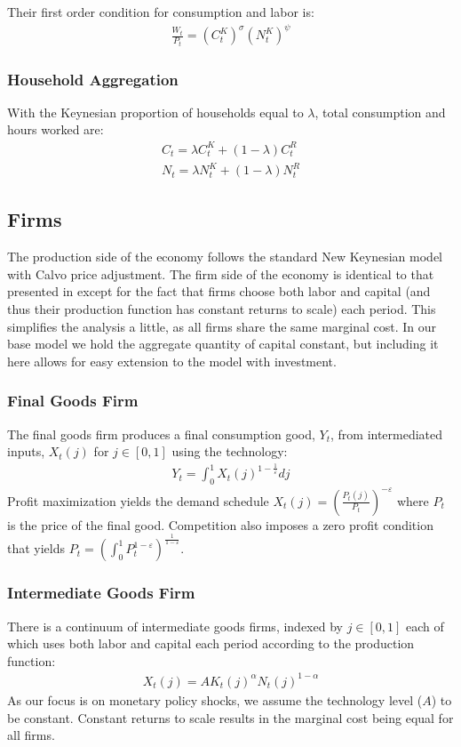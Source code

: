 \documentclass[titlepage]{\econtex}\newcommand{\texname}{ConsumptionHeterogeneity}
\begin{document}
Their first order condition for consumption and labor is:
\begin{align}
\frac{W_t}{P_t} = \left(C^K_t\right)^{\sigma}\left(N^K_t\right)^{\psi} \label{foc_hours_K}
\end{align}

\subsubsection{Household Aggregation}
With the Keynesian proportion of households equal to $\lambda$, total consumption and hours worked are:
\begin{align}
C_t = \lambda C^K_t + (1-\lambda) C^R_t \label{agg_C}\\
N_t = \lambda N^K_t + (1-\lambda) N^R_t \label{agg_N}
\end{align}

\subsection {Firms}
The production side of the economy follows the standard New Keynesian model with Calvo price adjustment. The firm side of the economy is identical to that presented in \cite{gali_book} except for the fact that firms choose both labor and capital (and thus their production function has constant returns to scale) each period. This simplifies the analysis a little, as all firms share the same marginal cost. In our base model we hold the aggregate quantity of capital constant, but including it here allows for easy extension to the model with investment.

\subsubsection{Final Goods Firm}
The final goods firm produces a final consumption good, $Y_t$, from intermediated inputs, $X_t(j)$ for $j \in [0,1]$ using the technology:
\begin{align*}
Y_t = \int_0^1 X_t(j)^{1-\frac{1}{\varepsilon}} dj
\end{align*}
Profit maximization yields the demand schedule $X_t(j) = \left(\frac{P_t(j)}{P_t}\right)^{-\varepsilon}$ where $P_t$ is the price of the final good. Competition also imposes a zero profit condition that yields $P_t = \left(\int_0^1 P_t^{1-\varepsilon}\right)^{\frac{1}{1-\varepsilon}}$.

\subsubsection{Intermediate Goods Firm}
There is a continuum of intermediate goods firms, indexed by $j \in [0,1]$ each of which uses both labor and capital each period according to the production function:
\begin{align*}
X_t(j) = A K_t(j)^\alpha N_t(j)^{1-\alpha}
\end{align*}
As our focus is on monetary policy shocks, we assume the technology level ($A$) to be constant. Constant returns to scale results in the marginal cost being equal for all firms.
\end{document}
